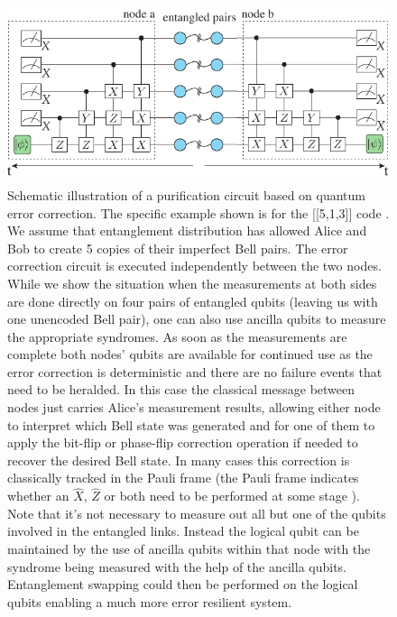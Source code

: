 \documentclass[twocolumn, aps, rmp, amsmath, amssymb, nofootinbib, superscriptaddress, longbibliography, floatfix, table-of-contents, eqsecnum]{revtex4-1}
\newcommand{\comment}[1]{{\color{blue}{\textbf{#1}}}}
\begin{document}
\begin{figure}[!htb]
\includegraphics[width=\textwidth]{repeaters_7}
\caption{\comment{Redo fig} Schematic illustration of a purification circuit based on quantum error correction. The specific example shown is for the [[5,1,3]] code \cite{bib:Bennettr1996a, bib:Knill97}. We assume that entanglement distribution has allowed Alice and Bob to create 5 copies of their imperfect Bell pairs. The error correction circuit is executed independently between the two nodes. While we show the situation when the measurements at both sides are done directly on four pairs of entangled qubits (leaving us with one unencoded Bell pair), one can also use ancilla qubits to measure the appropriate syndromes. As soon as the measurements are complete both nodes' qubits are available for continued use as the error correction is deterministic and there are no failure events that need to be heralded. In this case the classical message between nodes just carries Alice's measurement results, allowing either node to interpret which Bell state was generated and for one of them to apply the bit-flip or phase-flip correction operation if needed to recover the desired Bell state. In many cases this correction is classically tracked in the Pauli frame (the Pauli frame indicates whether an $\hat{X}$, $\hat{Z}$ or both need to be performed at some stage \cite{bib:jiang09, bib:munro10}). Note that it's not necessary to measure out all but one of the qubits involved in the entangled links. Instead the logical qubit can be maintained by the use of ancilla qubits within that node with the syndrome being measured with the help of the ancilla qubits. Entanglement swapping could then be performed on the logical qubits enabling a much more error resilient system.
}
\label{fig:repeaters_7}
\end{figure} 
\end{document}
